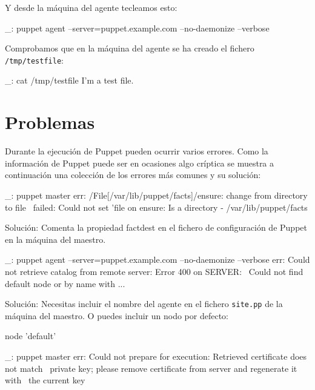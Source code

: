 Y desde la máquina del agente tecleamos esto:

\begin{bashcode}
_: puppet agent --server=puppet.example.com --no-daemonize --verbose
\end{bashcode}

Comprobamos que en la máquina del agente se ha creado el fichero \texttt{/tmp/testfile}:

\begin{bashcode}
_: cat /tmp/testfile
I'm a test file.
\end{bashcode}


\section{Problemas}

Durante la ejecución de Puppet pueden ocurrir varios errores. Como la información de Puppet puede ser en ocasiones algo críptica se muestra a continuación una colección de los errores más comunes y su solución:

\begin{bashcode}
_: puppet master
err: /File[/var/lib/puppet/facts]/ensure: change from directory to file \
failed: Could not set 'file on ensure: Is a directory - /var/lib/puppet/facts
\end{bashcode}

Solución: Comenta la propiedad factdest en el fichero de configuración de Puppet en la máquina del maestro.

\begin{bashcode}
_: puppet agent --server=puppet.example.com --no-daemonize --verbose
err: Could not retrieve catalog from remote server: Error 400 on SERVER: \
Could not find default node or by name with ...
\end{bashcode}

Solución: Necesitas incluir el nombre del agente en el fichero \texttt{site.pp} de la máquina del maestro. O puedes incluir un nodo por defecto:

\begin{rubycode}
node 'default' {
}
\end{rubycode}

\begin{bashcode}
_: puppet master
err: Could not prepare for execution: Retrieved certificate does not match \
private key; please remove certificate from server and regenerate it with \
the current key
\end{bashcode}

